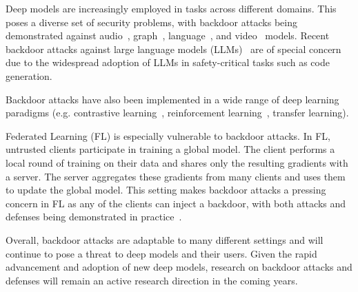 \documentclass[letterpaper,twocolumn,10pt]{article}
\begin{document}
\begin{appendices}
Deep models are increasingly employed in tasks across different domains. This poses a diverse set of security problems, with backdoor attacks being demonstrated against audio~\cite{chen2024audio}, graph~\cite{zhang2021graphs}, language~\cite{dai2019text}, and video~\cite{hammoud2024video} 
models. Recent backdoor attacks against large language models (LLMs)~\cite{yan2024easyllm, zhang2024instructllm} are of special concern due to the widespread adoption of LLMs in safety-critical tasks such as code generation.

Backdoor attacks have also been implemented in a wide range of deep learning paradigms (e.g. contrastive learning~\cite{li2024contrastive}, reinforcement learning~\cite{wang2021reinforce}, transfer learning).

Federated Learning (FL) is especially vulnerable to backdoor attacks. In FL, untrusted clients participate in training a global model. The client performs a local round of training on their data and shares only the resulting gradients with a server. The server aggregates these gradients from many clients and uses them to update the global model. This setting makes backdoor attacks a pressing concern in FL as any of the clients can inject a backdoor, with both attacks and defenses being demonstrated in practice~\cite{li2024detectfed, lyu2024attackfed, bagdasaryan20federated}.

Overall, backdoor attacks are adaptable to many different settings and will continue to pose a threat to deep models and their users. Given the rapid advancement and adoption of new deep models, research on backdoor attacks and defenses will remain an active research direction in the coming years.

\begin{table}[t]


\end{table}
\end{appendices}
\end{document}
